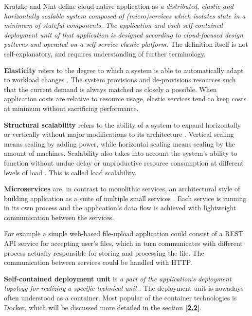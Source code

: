 \documentclass[article]{aaltoseries}
\begin{document}
Kratzke and Nint \cite{kratzke2017understanding} define cloud-native application as \textit{a distributed, elastic and horizontally scalable system composed of (micro)services which isolates state in a minimum of stateful components. The application and each self-contained deployment unit of that application is designed according to cloud-focused design patterns and operated on a self-service elastic platform.} The definition itself is not self-explanatory, and requires understanding of further terminology.

\textbf{Elasticity} refers to the degree to which a system is able to automatically adapt to workload changes \cite{herbst2013elasticity}. The system provisions and de-provisions resources such that the current demand is always matched as closely a possible. When application costs are relative to resource usage, elastic services tend to keep costs at minimum without sacrificing performance.

\textbf{Structural scalability} refers to the ability of a system to expand horizontally or vertically without major modifications to its architecture \cite{bondi2000characteristics}. Vertical scaling means scaling by adding power, while horizontal scaling means scaling by the amount of machines. Scalability also takes into account the system's ability to function without undue delay or unproductive resource consumption at different levels of load \cite{bondi2000characteristics}. This is called load scalability.

\textbf{Microservices} are, in contrast to monolithic services, an architectural style of building application as a suite of multiple small services \cite{fowler2014microservices}. Each service is running in its own process and the application's data flow is achieved with lightweight communication between the services.

For example a simple web-based file-upload application could consist of a REST API service for accepting user's files, which in turn communicates with different process actually responsible for storing and processing the file. The communication between services could be handled with HTTP.

\textbf{Self-contained deployment unit} is \textit{a part of the application’s deployment topology for realizing a specific technical unit} \cite{inzinger2014madcat}. The deployment unit is nowadays often understood as a container. Most popular of the container technologies is Docker, which will be discussed more detailed in the section \textbf{\ref{2.2}}.
\end{document}
